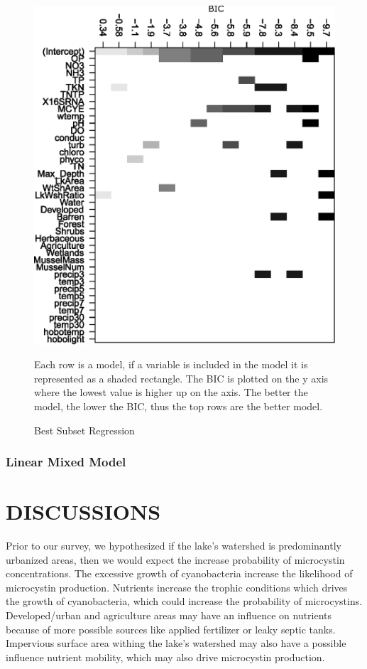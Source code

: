 \documentclass{ou-thesis}
\begin{document}
\begin{figure}[!t]
  \includegraphics[scale=0.8]{Subset}
  \caption{Best Subset Regression}
  \label{subset}
  Each row is a model, if a variable is included in the model it is represented as a shaded rectangle. The BIC is plotted on the y axis where the lowest value is higher up on the axis. The better the model, the lower the BIC, thus the top rows are the better model.
\end{figure}






\subsection{Linear Mixed Model}








\chapter{DISCUSSIONS}

Prior to our survey, we hypothesized if the lake's watershed is predominantly urbanized areas, then we would expect the increase probability of microcystin concentrations. The excessive growth of cyanobacteria increase the likelihood of microcystin production. Nutrients increase the trophic conditions which drives the growth of cyanobacteria, which could increase the probability of microcystins. Developed/urban and agriculture areas may have an influence on nutrients because of more possible sources like applied fertilizer or leaky septic tanks. Impervious surface area withing the lake's watershed may also have a possible influence nutrient mobility, which may also drive microcystin production.
\end{document}
